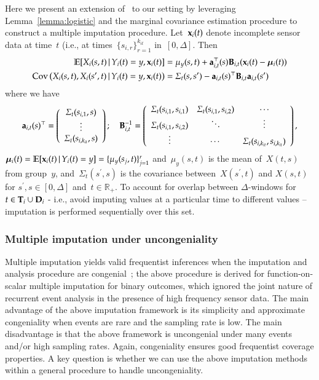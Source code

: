 \documentclass[12pt]{amsart}
\def\E{\mathcal{E}}
\def\E{\mathbb{E}}
\def\given{\, | \,}
\def\bfx{{\bf x}}
\def\bfT{{\bf T}}
\def\bfD{{\bf D}}
\begin{document}
Here we present an extension of~\cite{Petrovich2018} to our setting by leveraging Lemma~\ref{lemma:logistic} and the marginal covariance estimation procedure to construct a multiple imputation procedure. Let~$\bfx_{i} (t)$ denote incomplete sensor data at time~$t$ (i.e., at times~$\{ s_{i,r} \}_{r=1}^{k_{it}}$ in~$[0,\Delta]$. Then
\begin{align}
\label{eq:impute}
\E [ X_i (s,t) \given Y_i(t) = y, \bfx_i (t) ]
  &= \mu_y (s,t) + {\bf a}_{i,t}^\top (s) {\bf B}_{i,t} (\bfx_i (t) -
    \mathbold{\mu}_i (t) ) \\
\text{Cov} \left( X_i (s,t), X_i (s^\prime, t) \given Y_i (t) = y,
  \bfx_i (t) \right)
  &= \Sigma_{t} (s, s^\prime) -
    {\bf a}_{i,t} (s)^\top {\bf B}_{i,t} {\bf a}_{i,t} (s^\prime)
\end{align}
where we have
\[
{\bf a}_{i,t} (s)^\top = \left( \begin{array}{c} \Sigma_t (s_{i,1}, s) \\ \vdots \\
                       \Sigma_t (s_{i,k_{it}}, s) \end{array} \right); \quad
{\bf B}_{i,t}^{-1} = \left(
  \begin{array}{c c c}
    \Sigma_t(s_{i,1}, s_{i,1}) & \Sigma_t(s_{i,1}, s_{i,2}) & \cdots \\
    \Sigma_t(s_{i,1}, s_{i,2}) & \ddots & \vdots \\
    \vdots & \cdots & \Sigma_t (s_{i,k_{it}}, s_{i,k_{it}})
  \end{array} \right),
\]
$\mathbold{\mu}_i (t) = \E [ \bfx_i (t) \given Y_i (t) = y] = \{
\mu_y (s_{j}, t) \}_{j=1}^r$ and~$\mu_y (s,t)$ is the mean of~$X(t,s)$
from group~$y$, and~$\Sigma_t ( s^\prime, s)$ is the covariance
between~$X(s^\prime,t)$ and $X(s,t)$ for $s^\prime, s \in [0, \Delta]$
and~$t \in \mathbb{R}_+$.  To account for overlap between $\Delta$-windows for $t \in \bfT_i \cup \bfD_i$ - i.e., avoid imputing values at a particular time to different values -- imputation is performed sequentially over this set.

\subsubsection{Multiple imputation under uncongeniality}

Multiple imputation yields valid frequentist inferences when the imputation and analysis procedure are congenial~\citep{Meng1994};  the above procedure is derived for function-on-scalar multiple imputation for binary outcomes, which ignored the joint nature of recurrent event analysis in the presence of high frequency sensor data. The main advantage of the above imputation framework is its simplicity and approximate congeniality when events are rare and the sampling rate is low.  The main disadvantage is that the above framework is uncongenial under many events and/or high sampling rates. Again, congeniality ensures good frequentist coverage properties.  A key question is whether we can use the above imputation methods within a general procedure to handle uncongeniality.
\end{document}
